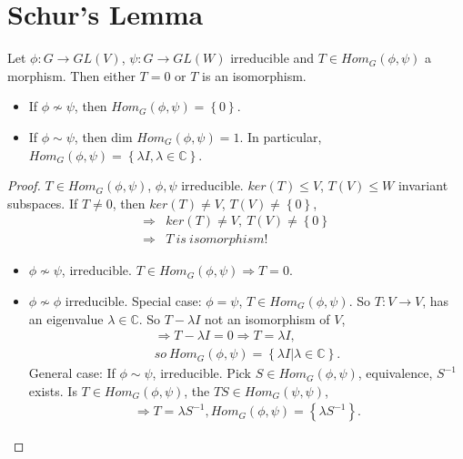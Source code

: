 \documentclass[../../note.tex]{subfiles}
\begin{document}
\section{Schur's Lemma}
\begin{lemma}
    Let $\phi: G \rightarrow GL(V)$, $\psi: G \rightarrow GL(W)$  irreducible and $T \in Hom_{G}(\phi, \psi)$ a morphism. Then either $T = 0$ or $T$ is an isomorphism.
    \begin{itemize}
        \item If $\phi \nsim \psi$, then $Hom_{G}(\phi, \psi) = \left\{0\right\}$.
        \item If $\phi \sim \psi$, then dim $Hom_{G}(\phi, \psi) = 1$. In particular, $Hom_{G}(\phi, \psi) = \left\{\lambda I, \lambda \in \mathbb{C} \right\}$.
    \end{itemize}
\end{lemma}
\begin{proof}
    $T \in Hom_{G}(\phi, \psi)$, $\phi, \psi$ irreducible. $ker(T) \leq V$, $T(V) \leq W$ invariant subspaces. If $T \neq 0$, then $ker(T) \neq V$, $T(V) \neq \left\{0\right\}$,
    \begin{align}
        \Longrightarrow &ker(T) \neq V,~T(V) \neq \left\{0\right\}\\
        \Longrightarrow &T~is~isomorphism!
    \end{align}
    \begin{itemize}
        \item $\phi \nsim \psi$, irreducible. $T \in Hom_{G}(\phi, \psi) \Longrightarrow T=0$.
        \item $\phi \nsim \phi$ irreducible.
        Special case: $\phi = \psi$, $T \in Hom_{G}(\phi, \psi)$. So $T: V \rightarrow V$, has an eigenvalue $\lambda \in \mathbb{C}$. So $T - \lambda I$ not an isomorphism of $V$,
        \begin{align}
            \Longrightarrow T - \lambda I = 0 \Longrightarrow T = \lambda I, \\
            so~Hom_{G}(\phi, \psi) = \left\{\lambda I \vert \lambda \in \mathbb{C} \right\}.
        \end{align}
        General case: If $\phi \sim \psi$, irreducible. Pick $S \in Hom_{G}(\phi, \psi)$, equivalence, $S^{-1}$ exists. Is $T \in Hom_{G}(\phi, \psi)$, the $TS \in Hom_{G}(\psi, \psi)$,
        \begin{align}
            \Longrightarrow T= \lambda S^{-1}, Hom_{G}(\phi, \psi) = \left\{\lambda S^{-1}\right\}.
        \end{align}
    \end{itemize}
\end{proof}
\end{document}
